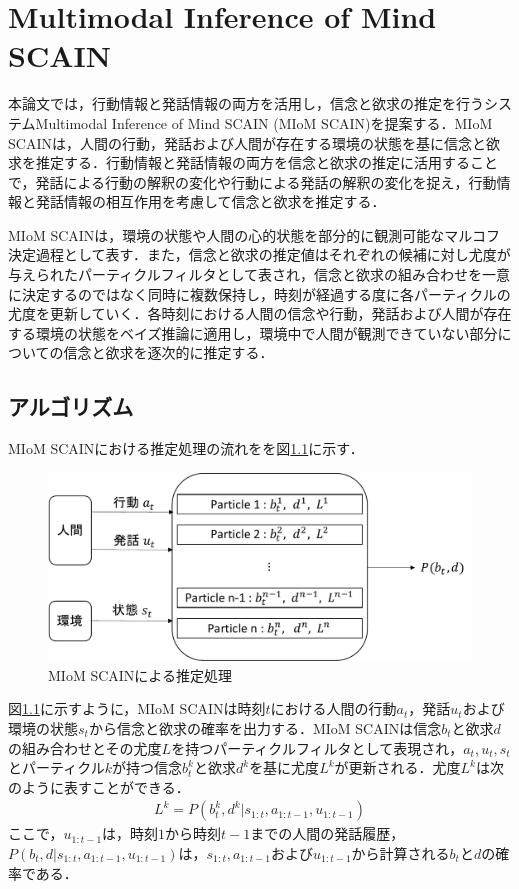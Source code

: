 \chapter{Multimodal Inference of Mind SCAIN}
\par
本論文では，行動情報と発話情報の両方を活用し，信念と欲求の推定を行うシステムMultimodal Inference of Mind SCAIN (MIoM SCAIN)を提案する．MIoM SCAINは，人間の行動，発話および人間が存在する環境の状態を基に信念と欲求を推定する．行動情報と発話情報の両方を信念と欲求の推定に活用することで，発話による行動の解釈の変化や行動による発話の解釈の変化を捉え，行動情報と発話情報の相互作用を考慮して信念と欲求を推定する．

\par
MIoM SCAINは，環境の状態や人間の心的状態を部分的に観測可能なマルコフ決定過程として表す．また，信念と欲求の推定値はそれぞれの候補に対し尤度が与えられたパーティクルフィルタとして表され，信念と欲求の組み合わせを一意に決定するのではなく同時に複数保持し，時刻が経過する度に各パーティクルの尤度を更新していく．各時刻における人間の信念や行動，発話および人間が存在する環境の状態をベイズ推論に適用し，環境中で人間が観測できていない部分についての信念と欲求を逐次的に推定する．


\section{アルゴリズム}

\par
MIoM SCAINにおける推定処理の流れをを図\ref{fig:sys_arc}に示す．
\begin{figure}[htbp]
  \begin{center}
    \includegraphics[scale=0.7]{./bt1.pdf}
    \caption{MIoM SCAINによる推定処理}
    \label{fig:sys_arc}
  \end{center}
\end{figure}
図\ref{fig:sys_arc}に示すように，MIoM SCAINは時刻$t$における人間の行動$a_t$，発話$u_t$および環境の状態$s_t$から信念と欲求の確率を出力する．MIoM SCAINは信念$b_t$と欲求$d$の組み合わせとその尤度$L$を持つパーティクルフィルタとして表現され，$a_t,u_t,s_t$とパーティクル$k$が持つ信念$b_t^k$と欲求$d^k$を基に尤度$L^k$が更新される．尤度$L^k$は次のように表すことができる．
\begin{equation}
  \begin{split}
  \label{pf}
  L^k=P(b_t^k,d^k|s_{1:t},a_{1:t-1},u_{1:t-1})
  \end{split}
\end{equation}
ここで，$u_{1:t-1}$は，時刻$1$から時刻$t-1$までの人間の発話履歴，$P(b_t,d|s_{1:t},a_{1:t-1},u_{1:t-1})$は，$s_{1:t},a_{1:t-1}およびu_{1:t-1}$から計算される$b_t$と$d$の確率である．

